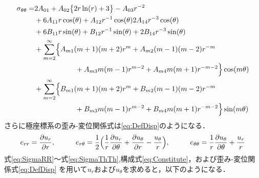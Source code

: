 \begin{align}
	\sigma_{\theta\theta} =&2A_{01}
	+A_{02}\bigl\{ 2r\ln(r)+3\bigr\}
	-A_{03}r^{-2}
	\nonumber
	\\
	&+6A_{11}r\cos(\theta)
	+A_{12}r^{-1}\cos(\theta)
	2A_{14}r^{-3}\cos(\theta)
	\nonumber
	\\
	&+6B_{11}r\sin(\theta)
	+B_{12}r^{-1}\sin(\theta)
	+2B_{14}r^{-3}\sin(\theta)
	\nonumber
	\\
	&+\sum_{m=2}^{\infty}\Bigl\{A_{m1}(m+1)(m+2)r^{m}
	+A_{m2}(m-1)(m-2)r^{-m}
	\nonumber
	\\
	&\hspace{2.0cm}
	+A_{m3}m(m-1)r^{m-2}
	+A_{m4}m(m+1)r^{-m-2}\Bigr\}\cos(m\theta)
	\nonumber
	\\
	&+\sum_{m=2}^{\infty}\Bigl\{B_{m1}(m+1)(m+2)r^{m}
	+B_{m2}(m-1)(m-2)r^{-m}
	\nonumber
	\\
	&\hspace{2.0cm}
	+B_{m3}m(m-1)r^{m-2}
	+B_{m4}m(m+1)r^{-m-2}\Bigr\}\sin(m\theta)
	\label{eq:SigmaThTh}
\end{align}
さらに極座標系の歪み-変位関係式は\eqref{eq:DefDisp}のようになる．
\begin{align}
	e_{rr}=\frac{\partial u_{r}}{\partial r},\hspace{1cm}
	e_{r\theta}=\frac{1}{2}\Bigl( \frac{1}{r}\frac{\partial u_{r}}{\partial \theta}
	+\frac{\partial u_{\theta}}{\partial r}-\frac{u_{\theta}}{r}\Bigr),\hspace{1cm}
	e_{\theta\theta}=\frac{1}{r}\frac{\partial u_{\theta}}{\partial \theta}+\frac{u_{r}}{r}
	\label{eq:DefDisp}
\end{align}
式\eqref{eq:SigmaRR}～式\eqref{eq:SigmaThTh},構成式\eqref{eq:Constitute}，および歪み-変位関係式\eqref{eq:DefDisp}
を用いて$u_r$および$u_\theta$を求めると，以下のようになる．
